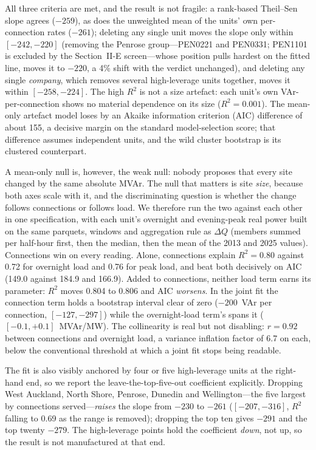 \documentclass[journal]{IEEEtran}
\begin{document}
All three criteria are met, and the result is not fragile: a rank-based Theil--Sen slope agrees ($-259$), as does the
unweighted mean of the units' own per-connection rates ($-261$); deleting any
single unit moves the slope only within $[-242,-220]$ (removing the Penrose
group---PEN0221 and PEN0331; PEN1101 is excluded by the Section~II-E
screen---whose position pulls hardest on the fitted line, moves it to
$-220$, a 4\% shift with the verdict unchanged), and deleting any single
\emph{company}, which removes several high-leverage units together, moves it
within $[-258,-224]$. The high $R^2$ is not a size artefact: each unit's
own VAr-per-connection shows no material dependence on its size ($R^2=0.001$).
The mean-only artefact model loses by an Akaike information criterion (AIC)
difference of about 155, a decisive
margin on the standard model-selection score; that difference assumes
independent units, and the wild cluster bootstrap is its clustered counterpart.

A mean-only null is, however, the weak null: nobody proposes that every site
changed by the same absolute MVAr. The null that matters is site \emph{size},
because both axes scale with it, and the discriminating question is whether the
change follows connections or follows load. We therefore run the two against each
other in one specification, with each unit's overnight and evening-peak real power
built on the same parquets, windows and aggregation rule as $\Delta Q$ (members
summed per half-hour first, then the median, then the mean of the 2013 and 2025
values). Connections win on every reading. Alone, connections explain $R^2=0.80$
against 0.72 for overnight load and 0.76 for peak load, and beat both decisively on
AIC (149.0 against 184.9 and 166.9). Added to connections, neither load term earns
its parameter: $R^2$ moves 0.804 to 0.806 and AIC \emph{worsens}. In the joint fit
the connection term holds a bootstrap interval clear of zero
($-200$~VAr per connection, $[-127,-297]$) while the overnight-load term's spans it
($[-0.1,+0.1]$~MVAr/MW). The collinearity is real but not disabling: $r=0.92$
between connections and overnight load, a variance inflation factor of 6.7 on
each, below the conventional threshold at which a joint fit stops being readable.

The fit is also visibly anchored by four or five high-leverage units at the
right-hand end, so we report the leave-the-top-five-out coefficient explicitly.
Dropping West Auckland, North Shore, Penrose, Dunedin and Wellington---the five
largest by connections served---\emph{raises} the slope from $-230$ to $-261$
($[-207,-316]$, $R^2$ falling to 0.69 as the range is removed); dropping the top
ten gives $-291$ and the top twenty $-279$. The high-leverage points hold the
coefficient \emph{down}, not up, so the result is not manufactured at that end.
\end{document}
